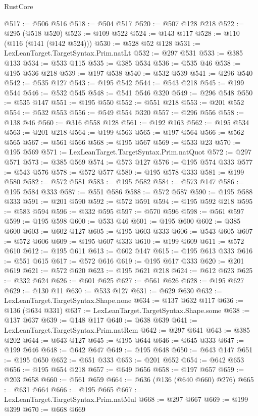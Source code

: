 \begin{lexlean}{RustCore}
\begin{coremodule}
@517 := @506 @516
@518 := @504 @517
@520 := @507 @128 @218
@522 := @295 (@518 @520)
@523 := @109 @522
@524 := @143 @117
@528 := @110 (@116 (@141 (@142 @524)))
@530 := @528 @52 @128
@531 := LexLeanTarget.TargetSyntax.Prim.natLt
@532 := @297 @531
@533 := @385 @133
@534 := @533 @115
@535 := @385 @534
@536 := @535 @46
@538 := @195 @536 @218
@539 := @197 @538
@540 := @532 @539
@541 := @296 @540
@542 := @535 @127
@543 := @195 @542
@544 := @543 @218
@545 := @199 @544
@546 := @532 @545
@548 := @541 @546 @320
@549 := @296 @548
@550 := @535 @147
@551 := @195 @550
@552 := @551 @218
@553 := @201 @552
@554 := @532 @553
@556 := @549 @554 @320
@557 := @296 @556
@558 := @138 @46
@560 := @316 @558 @128
@561 := @192 @163
@562 := @195 @534
@563 := @201 @218
@564 := @199 @563
@565 := @197 @564
@566 := @562 @565
@567 := @561 @566
@568 := @195 @567
@569 := @533 @23
@570 := @195 @569
@571 := LexLeanTarget.TargetSyntax.Prim.natQuot
@572 := @297 @571
@573 := @385 @569
@574 := @573 @127
@576 := @195 @574 @333
@577 := @543 @576
@578 := @572 @577
@580 := @195 @578 @333
@581 := @199 @580
@582 := @572 @581
@583 := @195 @582
@584 := @573 @147
@586 := @195 @584 @333
@587 := @551 @586
@588 := @572 @587
@590 := @195 @588 @333
@591 := @201 @590
@592 := @572 @591
@594 := @195 @592 @218
@595 := @583 @594
@596 := @332 @595
@597 := @570 @596
@598 := @561 @597
@599 := @195 @598
@600 := @533 @46
@601 := @195 @600
@602 := @385 @600
@603 := @602 @127
@605 := @195 @603 @333
@606 := @543 @605
@607 := @572 @606
@609 := @195 @607 @333
@610 := @199 @609
@611 := @572 @610
@612 := @195 @611
@613 := @602 @147
@615 := @195 @613 @333
@616 := @551 @615
@617 := @572 @616
@619 := @195 @617 @333
@620 := @201 @619
@621 := @572 @620
@623 := @195 @621 @218
@624 := @612 @623
@625 := @332 @624
@626 := @601 @625
@627 := @561 @626
@628 := @195 @627
@629 := @130 @11
@630 := @533 @127
@631 := @629 @630
@632 := LexLeanTarget.TargetSyntax.Shape.none
@634 := @137 @632 @117
@636 := @136 (@634 @331)
@637 := LexLeanTarget.TargetSyntax.Shape.some
@638 := @137 @637
@639 := @148 @117
@640 := @638 @639
@641 := LexLeanTarget.TargetSyntax.Prim.natRem
@642 := @297 @641
@643 := @385 @202
@644 := @643 @127
@645 := @195 @644
@646 := @645 @333
@647 := @199 @646
@648 := @642 @647
@649 := @195 @648
@650 := @643 @147
@651 := @195 @650
@652 := @651 @333
@653 := @201 @652
@654 := @642 @653
@656 := @195 @654 @218
@657 := @649 @656
@658 := @197 @657
@659 := @203 @658
@660 := @561 @659
@664 := @636 (@136 (@640 @660) @276)
@665 := @631 @664
@666 := @195 @665
@667 := LexLeanTarget.TargetSyntax.Prim.natMul
@668 := @297 @667
@669 := @199 @399
@670 := @668 @669

\end{coremodule}
\end{lexlean}
